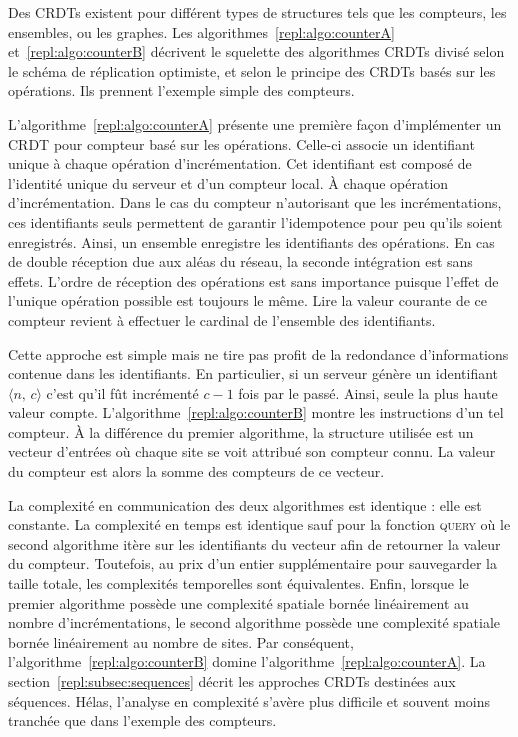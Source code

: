 Des CRDTs existent pour différent types de structures tels que les compteurs,
les ensembles, ou les graphes. Les algorithmes~\ref{repl:algo:counterA}
et~\ref{repl:algo:counterB} décrivent le squelette des algorithmes CRDTs divisé
selon le schéma de réplication optimiste, et selon le principe des CRDTs basés
sur les opérations. Ils prennent l'exemple simple des compteurs.

L'algorithme~\ref{repl:algo:counterA} présente une première façon d'implémenter
un CRDT pour compteur basé sur les opérations. Celle-ci associe un identifiant
unique à chaque opération d'incrémentation. Cet identifiant est composé de
l'identité unique du serveur et d'un compteur local. À chaque opération
d'incrémentation. Dans le cas du compteur n'autorisant que les incrémentations,
ces identifiants seuls permettent de garantir l'idempotence pour peu qu'ils
soient enregistrés. Ainsi, un ensemble enregistre les identifiants des
opérations. En cas de double réception due aux aléas du réseau, la seconde
intégration est sans effets. L'ordre de réception des opérations est sans
importance puisque l'effet de l'unique opération possible est toujours le
même. Lire la valeur courante de ce compteur revient à effectuer le cardinal de
l'ensemble des identifiants.

Cette approche est simple mais ne tire pas profit de la redondance
d'informations contenue dans les identifiants. En particulier, si un serveur
génère un identifiant $\langle n,\, c\rangle$ c'est qu'il fût incrémenté $c-1$
fois par le passé. Ainsi, seule la plus haute valeur
compte. L'algorithme~\ref{repl:algo:counterB} montre les instructions d'un tel
compteur. À la différence du premier algorithme, la structure utilisée est un
vecteur d'entrées où chaque site se voit attribué son compteur connu. La valeur
du compteur est alors la somme des compteurs de ce vecteur.

La complexité en communication des deux algorithmes est identique : elle est
constante. La complexité en temps est identique sauf pour la fonction
\textsc{query} où le second algorithme itère sur les identifiants du vecteur
afin de retourner la valeur du compteur. Toutefois, au prix d'un entier
supplémentaire pour sauvegarder la taille totale, les complexités temporelles
sont équivalentes. Enfin, lorsque le premier algorithme possède une complexité
spatiale bornée linéairement au nombre d'incrémentations, le second algorithme
possède une complexité spatiale bornée linéairement au nombre de sites. Par
conséquent, l'algorithme~\ref{repl:algo:counterB} domine
l'algorithme~\ref{repl:algo:counterA}. La section~\ref{repl:subsec:sequences}
décrit les approches CRDTs destinées aux séquences. Hélas, l'analyse en
complexité s'avère plus difficile et souvent moins tranchée que dans l'exemple
des compteurs.


